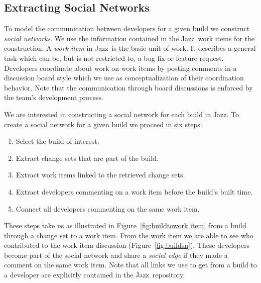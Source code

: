\subsection{Extracting Social Networks}
\label{subsec:social}
To model the communication between developers for a given build we construct \emph{social networks}. 
We use the information contained in the Jazz\texttrademark\ work items for the construction. 
A \emph{work item} in Jazz\texttrademark\ is the basic unit of work. 
It describes a general task which can be, but is not restricted to, a bug fix or feature request.
Developers coordinate about work on work items by posting comments in a discussion board style which we use as conceptualization of their coordination behavior.
Note that the communication through board discussions is enforced by the team's development process. 


We are interested in constructing a social network for each
build in Jazz\texttrademark. 
To create a social network for a given build we proceed in six steps:

\begin{enumerate}
\item Select the build of interest.
\item Extract change sets that are part of the build.
\item Extract work items linked to the retrieved change sets.
\item Extract developers commenting on a work item before the build's built time.
\item Connect all developers commenting on the same work item.
\end{enumerate}

These steps take us as illustrated in Figure~\ref{fig:buildtowork item}
from a build through a change set to a work item. From the work item we are able to
see who contributed to the work item discussion (Figure~\ref{fig:buildsn}).
These developers become part of the social network and
share a \emph{social edge} if they made a comment on the same work item.
Note that all links we use to get from a build to a developer are explicitly contained in
the Jazz\texttrademark\ repository.




